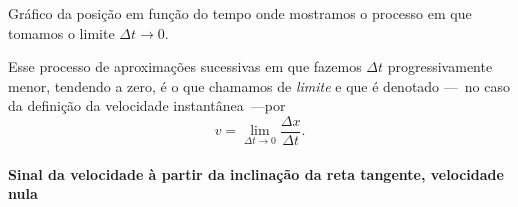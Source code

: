 \begin{marginfigure}[-1.5cm]
\caption{Gráfico da posição em função do tempo onde mostramos o processo em que tomamos o limite $\Delta t \to 0$.\label{Fig:Interp_graf_vel_med_lim}}
\end{marginfigure}

Esse processo de aproximações sucessivas em que fazemos $\Delta t$ progressivamente menor, tendendo a zero, é o que chamamos de \emph{limite} e que é denotado ---~no caso da definição da velocidade instantânea~---por
\begin{equation}
  v = \lim_{\Delta t \to 0} \frac{\Delta x}{\Delta t}.
\end{equation}

\paragraph{Sinal da velocidade à partir da inclinação da reta tangente, velocidade nula}

